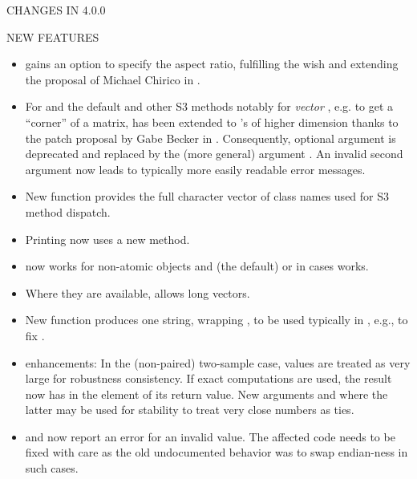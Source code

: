 \documentclass[letterpaper]{book}
\begin{document}
\begin{Section}{ CHANGES IN 4.0.0}
\begin{SubSection}{NEW FEATURES}
\begin{itemize}
\item{}  gains an option  to specify the
aspect ratio, fulfilling the wish and extending the proposal of
Michael Chirico in .

\item{} For  and  the default and
other S3 methods notably for \emph{vector} , e.g. to get a
``corner'' of a matrix, has been extended to 's
of higher dimension thanks to the patch proposal by Gabe Becker in
.  Consequently, optional argument  is
deprecated and replaced by the (more general) argument
.  An invalid second argument  now leads
to typically more easily readable error messages.

\item{} New function  provides the full character
vector of class names used for S3 method dispatch.

\item{} Printing  now uses a new  method.

\item{}  now works for non-atomic objects
 and  (the default) or
 in cases  works.

\item{} Where they are available,  allows
long vectors.

\item{} New function  produces one string, wrapping
, to be used typically in
, e.g., to fix .

\item{}  enhancements: In the (non-paired)
two-sample case,  values are treated as very large for
robustness consistency.  If exact computations are used, the
result now has  in the  element of its
return value.  New arguments  and
 where the latter may be used for stability to
treat very close numbers as ties.

\item{}  and  now report an error
for an invalid  value.  The affected code needs to be
fixed with care as the old undocumented behavior was to swap
endian-ness in such cases.


\end{itemize}
\end{SubSection}
\end{Section}
\end{document}
